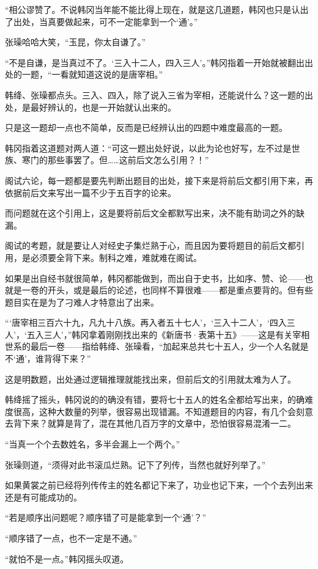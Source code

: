 “相公谬赞了。不说韩冈当年能不能比得上现在，就是这几道题，韩冈也只是认出了出处，当真要做起来，可不一定能拿到一个‘通’。”

张璪哈哈大笑，“玉昆，你太自谦了。”

“不是自谦，是当真过不了。‘三入十二人，四入三人’。”韩冈指着一开始就被翻出出处的一题，“一看就知道这说的是唐宰相。”

韩绛、张璪都点头。三入、四入，除了说入三省为宰相，还能说什么？这一题的出处，是最好辨认的，也是一开始就认出来的。

只是这一题却一点也不简单，反而是已经辨认出的四题中难度最高的一题。

韩冈指着这道题对两人道：“可这一题出处好说，以此为论也好写，左不过是世族、寒门的那些事罢了。但……这前后文怎么引用？！”

阁试六论，每一题都是要先判断出题目的出处，接下来是将前后文都引用下来，再依据前后文来写出一篇不少于五百字的论来。

而问题就在这个引用上，这是要将前后文全都默写出来，决不能有助词之外的缺漏。

阁试的考题，就是要让人对经史子集烂熟于心，而且因为要将题目的前后文都引用，是必须要全背下来。制科之难，难就难在阁试。

如果是出自经书就很简单，韩冈都能做到，而出自于史书，比如序、赞、论——也就是一卷的开头，或是最后的论述，也同样不算很难——都是重点要背的。但有些题目实在是为了刁难人才特意出了出来。

“‘唐宰相三百六十九，凡九十八族。再入者五十七人’，‘三入十二人’，‘四入三人’，‘五入三人’，”韩冈拿着刚刚找出来的《新唐书·表第十五》——这是有关宰相世系的最后一卷——指给韩绛、张璪看，“加起来总共七十五人，少一个人名就是不‘通’，谁背得下来？”

这是明数题，出处通过逻辑推理就能找出来，但前后文的引用就太难为人了。

韩绛摇了摇头，韩冈说的的确没有错，要将七十五人的姓名全都给写出来，的确难度很高，这种大数量的列举，很容易出现错漏。不知道题目的内容，有几个会刻意去背下来？就算是背了，混在其他几百万字的文章中，恐怕很容易混淆一二。

“当真一个个去数姓名，多半会漏上一个两个。”

张璪则道，“须得对此书滚瓜烂熟。记下了列传，当然也就好列举了。”

如果黄裳之前已经将列传传主的姓名都记下来了，功业也记下来，一个个去列出来还是有可能成功的。

“若是顺序出问题呢？顺序错了可是能拿到一个‘通’？”

“顺序错了一点，也不一定是不通。”

“就怕不是一点。”韩冈摇头叹道。

